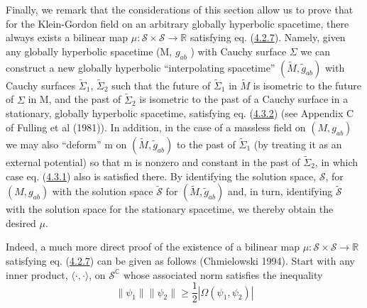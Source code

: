 \documentclass[11pt,a4paper]{article}
\begin{document}
Finally, we remark that the considerations of this section allow us to prove that for the Klein-Gordon field on an arbitrary globally hyperbolic spacetime, there always exists a bilinear map \(\mu: \mathcal{S} \times \mathcal{S} \to \mathbb{R}\) satisfying eq. (\hyperref[eq:4.2.7]{4.2.7}). Namely, given any globally hyperbolic spacetime (M, \(g_{ab}\) ) with Cauchy surface \(\Sigma\) we can construct a new globally hyperbolic ``interpolating spacetime'' \((\tilde{M}, \tilde{g}_{ab})\) with Cauchy surfaces \(\tilde{\Sigma}_1\), \(\tilde{\Sigma}_2\) such that the future of \(\tilde{\Sigma}_1\) in \(\tilde{M}\) is isometric to the future of \(\Sigma\) in M, and the past of \(\widetilde{\Sigma}_2\) is isometric to the past of a Cauchy surface in a stationary, globally hyperbolic spacetime, satisfying eq. (\hyperref[eq:4.3.2]{4.3.2}) (see Appendix C of Fulling et al (1981)). In addition, in the case of a massless field on \((M,g_{ab})\) we may also ``deform'' m on \((\widetilde{M}, \widetilde{g}_{ a b})\) to the past of \(\widetilde{\Sigma}_{ 1}\) (by treating it as an external potential) so that m is nonzero and constant in the past of \(\tilde{\Sigma}_2\), in which case eq. (\hyperref[eq:4.3.1]{4.3.1}) also is satisfied there. By identifying the solution space, \(\mathcal{S}\), for \((M, g_{ab})\) with the solution space \(\tilde{\mathcal{S}}\) for \((\tilde{M}, \tilde{g}_{ab})\) and, in turn, identifying \(\tilde{\mathcal{S}}\) with the solution space for the stationary spacetime, we \hypertarget{source-78}{} thereby obtain the desired \(\mu\).

Indeed, a much more direct proof of the existence of a bilinear map \(\mu: \mathcal{S} \times \mathcal{S} \to \mathbb{R}\) satisfying eq. (\hyperref[eq:4.2.7]{4.2.7}) can be given as follows (Chmielowski 1994). Start with any inner product, \(\langle\cdot,\cdot\rangle\), on \(\mathcal{S}^{\mathbb{C}}\) whose associated norm satisfies the inequality
\begin{equation*}
\lVert \psi_1\rVert \lVert \psi_2\rVert \ge \frac{1}{2} |\Omega(\psi_1, \psi_2)| \tag{4.3.10}\label{eq:4.3.10}
\end{equation*}
\end{document}
